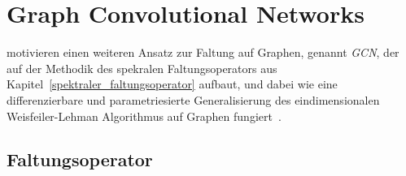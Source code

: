 \section{Graph Convolutional Networks}
\label{graph_convolutional_networks}

\citeauthor{gcn} motivieren einen weiteren Ansatz zur Faltung auf Graphen, genannt \emph{\gls{GCN}}, der auf der Methodik des spekralen Faltungsoperators aus Kapitel~\ref{spektraler_faltungsoperator} aufbaut, und dabei wie eine differenzierbare und parametriesierte Generalisierung des eindimensionalen Weisfeiler-Lehman Algorithmus auf Graphen fungiert~\cite{gcn}.

\subsection{Faltungsoperator}
\label{gcn_faltungsoperator}

